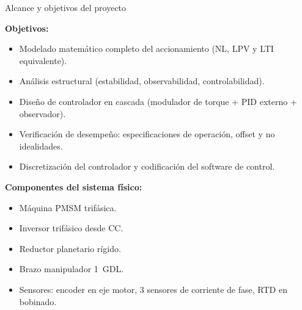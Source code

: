 \documentclass[aspectratio=169,t]{beamer}
\begin{document}
\begin{frame}{Alcance y objetivos del proyecto}
  \vspace{4mm}

  \textbf{Objetivos:}
  \begin{itemize}
    \item Modelado matemático completo del accionamiento (NL, LPV y LTI equivalente).
    \item Análisis estructural (estabilidad, observabilidad, controlabilidad).
    \item Diseño de controlador en cascada (modulador de torque + PID externo + observador).
    \item Verificación de desempeño: especificaciones de operación, offset y no idealidades.
    \item Discretización del controlador y codificación del software de control.
  \end{itemize}

  \vspace{3mm}
  \textbf{Componentes del sistema físico:}
  \begin{itemize}
    \item Máquina PMSM trifásica.
    \item Inversor trifásico desde CC.
    \item Reductor planetario rígido.
    \item Brazo manipulador 1~GDL.
    \item Sensores: encoder en eje motor, 3 sensores de corriente de fase, RTD en bobinado.
  \end{itemize}
\end{frame}
\end{document}

